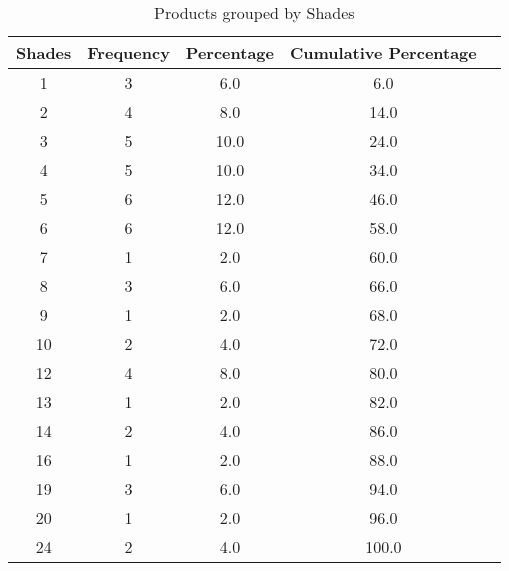 \begin{table}[htbp]
    \centering
    \caption{Products grouped by Shades}
    \label{tab:prod_by_shades}
    \begin{tabular}{ccccc}        \hline
        \textbf{Shades} & \textbf{Frequency} & \textbf{Percentage} & \textbf{Cumulative Percentage} \\ \hline
        1               & 3                  & 6.0                 & 6.0                            \\
        2               & 4                  & 8.0                 & 14.0                           \\
        3               & 5                  & 10.0                & 24.0                           \\
        4               & 5                  & 10.0                & 34.0                           \\
        5               & 6                  & 12.0                & 46.0                           \\
        6               & 6                  & 12.0                & 58.0                           \\
        7               & 1                  & 2.0                 & 60.0                           \\
        8               & 3                  & 6.0                 & 66.0                           \\
        9               & 1                  & 2.0                 & 68.0                           \\
        10              & 2                  & 4.0                 & 72.0                           \\
        12              & 4                  & 8.0                 & 80.0                           \\
        13              & 1                  & 2.0                 & 82.0                           \\
        14              & 2                  & 4.0                 & 86.0                           \\
        16              & 1                  & 2.0                 & 88.0                           \\
        19              & 3                  & 6.0                 & 94.0                           \\
        20              & 1                  & 2.0                 & 96.0                           \\
        24              & 2                  & 4.0                 & 100.0                          \\
    \end{tabular}
\end{table}
